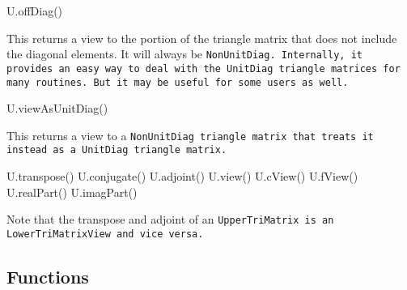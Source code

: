 \begin{tmvcode}
U.offDiag()
\end{tmvcode}
This returns a view to the portion of the triangle matrix that does not include
the diagonal elements.  It will always be \tt{NonUnitDiag}.
Internally, it provides an easy way to deal with the \tt{UnitDiag} triangle matrices
for many routines.  But it may be useful for some users as well.

\begin{tmvcode}
U.viewAsUnitDiag()
\end{tmvcode}
This returns a view to a \tt{NonUnitDiag} triangle matrix that treats it
instead as a \tt{UnitDiag} triangle matrix.

\begin{tmvcode}
U.transpose()
U.conjugate()
U.adjoint()
U.view()
U.cView()
U.fView()
U.realPart()
U.imagPart()
\end{tmvcode}
Note that the transpose and adjoint of an \tt{UpperTriMatrix} is an
\tt{LowerTriMatrixView} and vice versa.
\vspace{12pt}

\subsection{Functions}
\label{TriMatrix_Functions}

